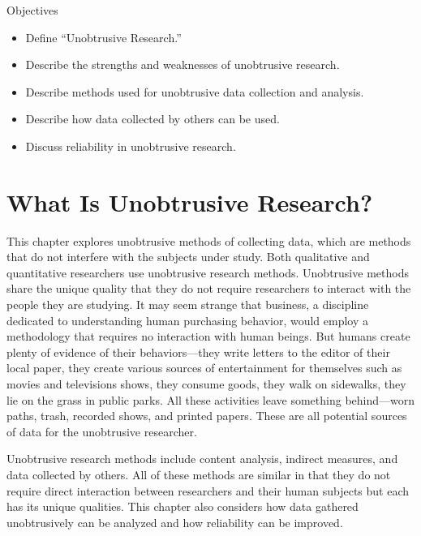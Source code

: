 \begin{center}
	\begin{objbox}{Objectives}
		\begin{itemize}
			\setlength{\itemsep}{0pt}
			\setlength{\parskip}{0pt}
			\setlength{\parsep}{0pt}
			
			\item Define ``Unobtrusive Research.''
			\item Describe the strengths and weaknesses of unobtrusive research.
			\item Describe methods used for unobtrusive data collection and analysis.
			\item Describe how data collected by others can be used.
			\item Discuss reliability in unobtrusive research.
		\end{itemize}
	\end{objbox}
\end{center}

\section{What Is Unobtrusive Research?}

This chapter explores unobtrusive methods of collecting data, which are methods that do not interfere with the subjects under study. Both qualitative and quantitative researchers use unobtrusive research methods. Unobtrusive methods share the unique quality that they do not require researchers to interact with the people they are studying. It may seem strange that business, a discipline dedicated to understanding human purchasing behavior, would employ a methodology that requires no interaction with human beings. But humans create plenty of evidence of their behaviors---they write letters to the editor of their local paper, they create various sources of entertainment for themselves such as movies and televisions shows, they consume goods, they walk on sidewalks, they lie on the grass in public parks. All these activities leave something behind---worn paths, trash, recorded shows, and printed papers. These are all potential sources of data for the unobtrusive researcher.

Unobtrusive research methods include content analysis, indirect measures, and data collected by others. All of these methods are similar in that they do not require direct interaction between researchers and their human subjects but each has its unique qualities. This chapter also considers how data gathered unobtrusively can be analyzed and how reliability can be improved.

